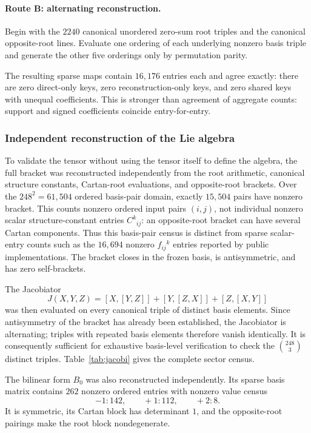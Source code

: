 \documentclass[11pt]{article}
\theoremstyle{definition}
\theoremstyle{remark}
\begin{document}
\paragraph{Route B: alternating reconstruction.}
Begin with the $2240$ canonical unordered zero-sum root triples and the canonical opposite-root lines.  Evaluate one ordering of each underlying nonzero basis triple and generate the other five orderings only by permutation parity.

The resulting sparse maps contain $16{,}176$ entries each and agree exactly: there are zero direct-only keys, zero reconstruction-only keys, and zero shared keys with unequal coefficients.  This is stronger than agreement of aggregate counts: support and signed coefficients coincide entry-for-entry.

\subsubsection{Independent reconstruction of the Lie algebra}

To validate the tensor without using the tensor itself to define the algebra, the full bracket was reconstructed independently from the root arithmetic, canonical structure constants, Cartan-root evaluations, and opposite-root brackets.  Over the $248^2=61{,}504$ ordered basis-pair domain, exactly $15{,}504$ pairs have nonzero bracket.  This counts nonzero ordered input pairs $(i,j)$, not individual nonzero scalar structure-constant entries $C^k{}_{ij}$: an opposite-root bracket can have several Cartan components.  Thus this basis-pair census is distinct from sparse scalar-entry counts such as the $16{,}694$ nonzero $f_{ij}{}^k$ entries reported by public implementations.  The bracket closes in the frozen basis, is antisymmetric, and has zero self-brackets.

The Jacobiator
\[
J(X,Y,Z)=[X,[Y,Z]]+[Y,[Z,X]]+[Z,[X,Y]]
\]
was then evaluated on every canonical triple of distinct basis elements.  Since antisymmetry of the bracket has already been established, the Jacobiator is alternating; triples with repeated basis elements therefore vanish identically.  It is consequently sufficient for exhaustive basis-level verification to check the $\binom{248}{3}$ distinct triples.  Table~\ref{tab:jacobi} gives the complete sector census.


The bilinear form $B_0$ was also reconstructed independently.  Its sparse basis matrix contains $262$ nonzero ordered entries with nonzero value census
\[
-1:142,\qquad +1:112,\qquad +2:8.
\]
It is symmetric, its Cartan block has determinant $1$, and the opposite-root pairings make the root block nondegenerate.
\end{document}
